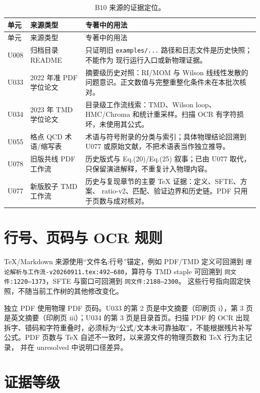 \begin{longtable}{@{}p{}p{}p{}@{}}
\caption{B10 来源的证据定位。}\label{tab:b10-sources}\\
\toprule
单元 & 来源类型 & 专著中的用法 \\
\midrule
\endfirsthead
\toprule
单元 & 来源类型 & 专著中的用法 \\
\midrule
\endhead
U008 & 归档目录 README & 只证明旧 \texttt{examples/...} 路径和日志文件是历史快照；不能作为
现行运行入口或新物理证据。 \\
U033 & 2022 年准 PDF 学位论文 & 摘要级历史对照：RI/MOM 与 Wilson 线线性发散的
问题意识。正文数值与完整重整化条件未在本批次核对。 \\
U034 & 2023 年 TMD 学位论文 & 目录级工作流线索：TMD、Wilson loop、HMC/Chroma
和统计重采样。扫描 OCR 有字符损坏，未使用其公式。 \\
U055 & 格点 QCD 术语/缩写表 & 术语与符号附录的分类与索引；具体物理结论回溯到
U077 或原始文献，不把术语表当作独立推导。 \\
U078 & 旧版共线 PDF 工作流 & 历史版式与 Eq.(20)/Eq.(25) 叙事；已由 U077 取代，
只保留演进解释，不重复计入物理内容。 \\
U077 & 新版胶子 TMD 工作流 & 历史与复现章节的主要 TeX 证据：定义、SFTE、方案、
ratio-v2、匹配、验证边界和历史链。PDF 只用于页数与成对核对。 \\
\bottomrule
\end{longtable}

\section{行号、页码与 OCR 规则}

TeX/Markdown 来源使用“文件名:行号”锚定，例如 PDF/TMD 定义可回溯到
\texttt{理论解析与工作流-v20260911.tex:492--680}，算符与 TMD staple 可回溯到
\texttt{同文件:1220--1373}，SFTE 与窗口可回溯到 \texttt{同文件:2188--2300}。
这些行号指向固定快照，不随当前工作树的其他修改变化。

独立 PDF 使用物理 PDF 页码。U033 的第 2 页是中文摘要（印刷页 i），第 3 页
是英文摘要（印刷页 iii）；U034 的第 3 页是目录首页。扫描 PDF 的 OCR 出现
拆字、错码和字符重叠时，必须标为“公式/文本未可靠抽取”，不能根据残片补写
公式。PDF 页数与 TeX 自述不一致时，以来源文件的物理页数和 TeX 行为主记录，
并在 unresolved 中说明口径差异。

\section{证据等级}

